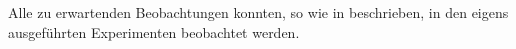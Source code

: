Alle zu erwartenden Beobachtungen konnten, so wie in \cite{book:regele} beschrieben, in den eigens ausgeführten Experimenten beobachtet werden.